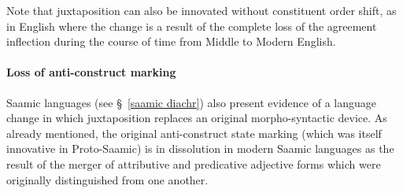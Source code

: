 {Note that juxtaposition can also be innovated without constituent order shift, as in English where the change is a result of the complete loss of the agreement inflection during the course of time from Middle to Modern English. 

\paragraph{Loss of anti-construct marking}
Saamic languages (see \S~\ref{saamic diachr}) also present evidence of a language change in which juxtaposition replaces an original morpho-syntactic device. As already mentioned, the original anti-construct state marking (which was itself innovative in Proto-Saamic) is in dissolution in modern Saamic languages as the result of the merger of attributive and predicative adjective forms which were originally distinguished from one another.

}
